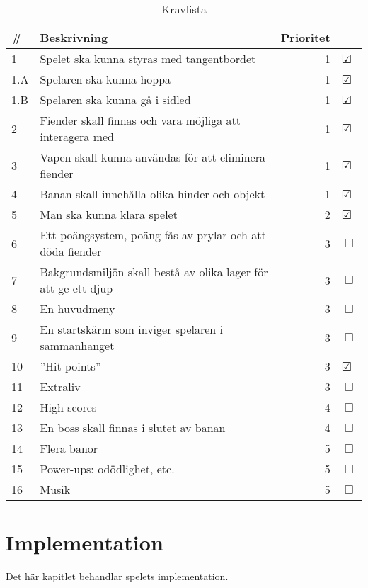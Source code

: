 \documentclass{scrartcl}
\begin{document}
\begin{table}[ht]
	\caption{Kravlista}\label{kravlista}
	\centering
	\begin{tabular}{lp{8cm}rl}
	\toprule
		\# & Beskrivning & Prioritet &  \\
	\midrule
	1 & Spelet ska kunna styras med tangentbordet &
		1 & $\CheckedBox$ \\
	1.A & Spelaren ska kunna hoppa &
		1 & $\CheckedBox$ \\
	1.B & Spelaren ska kunna gå i sidled &
		1 & $\CheckedBox$ \\
	2 & Fiender skall finnas och vara möjliga att interagera med &
		1 & $\CheckedBox$ \\
	3 & Vapen skall kunna användas för att eliminera fiender &
		1 & $\CheckedBox$ \\
	4 & Banan skall innehålla olika hinder och objekt  &
		1 & $\CheckedBox$ \\
	5 & Man ska kunna klara spelet &
		2 & $\CheckedBox$ \\
	6 & Ett poängsystem, poäng fås av prylar och att döda fiender &
		3 & $\Box$ \\
	7 & Bakgrundsmiljön skall bestå av olika lager för att ge ett djup &
		3 & $\Box$ \\
	8 & En huvudmeny &
		3 & $\Box$ \\
	9 & En startskärm som inviger spelaren i sammanhanget &
		3 & $\Box$ \\
	10 & ”Hit points” &
		3 & $\CheckedBox$ \\
	11 & Extraliv &
		3 & $\Box$ \\
	12 & High scores &
		4 & $\Box$ \\
	13 & En boss skall finnas i slutet av banan &
		4 & $\Box$ \\
	14 & Flera banor &
		5 & $\Box$ \\
	15 & Power-ups: odödlighet, etc. &
		5 & $\Box$ \\
	16 & Musik &
		5 & $\Box$ \\

	\bottomrule
	\end{tabular}
\end{table}

\section{Implementation}
Det här kapitlet behandlar spelets implementation.
\end{document}
